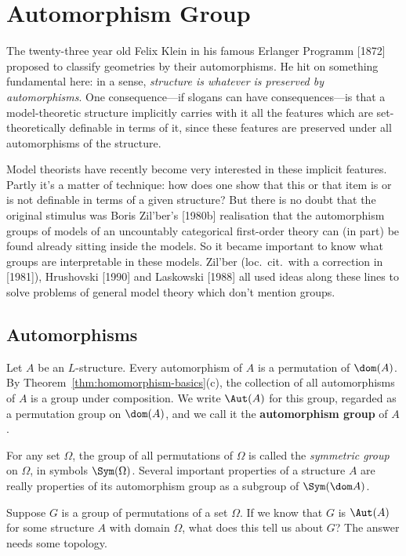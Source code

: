 \chapter{Automorphism Group}


The twenty-three year old Felix Klein in his famous Erlanger Programm [1872] proposed to classify geometries by their automorphisms. He hit on something fundamental here: in a sense, \textit{structure is whatever is preserved by automorphisms}. One consequence---if slogans can have consequences---is that a model-theoretic structure implicitly carries with it all the features which are set-theoretically definable in terms of it, since these features are preserved under all automorphisms of the structure.

Model theorists have recently become very interested in these implicit features. Partly it’s a matter of technique: how does one show that this or that item is or is not definable in terms of a given structure? But there is no doubt that the original stimulus was Boris Zil’ber’s [1980b] realisation that the automorphism groups of models of an uncountably categorical first-order theory can (in part) be found already sitting inside the models. So it became important to know what groups are interpretable in these models. Zil’ber (loc.\ cit.\ with a correction in [1981]), Hrushovski [1990] and Laskowski [1988] all used ideas along these lines to solve problems of general model theory which don’t mention groups.

\section{Automorphisms}

Let $A$ be an $L$-structure. Every automorphism of $A$ is a permutation of $\dom(A)$. By Theorem~\ref{thm:homomorphism-basics}(c), the collection of all automorphisms of $A$ is a group under composition. We write $\Aut(A)$ for this group, regarded as a permutation group on $\dom(A)$, and we call it the \textbf{automorphism group} of $A$.

For any set $\Omega$, the group of all permutations of $\Omega$ is called the \textit{symmetric group} on $\Omega$, in symbols $\Sym(\Omega)$. Several important properties of a structure $A$ are really properties of its automorphism group as a subgroup of $\Sym(\dom A)$.


Suppose $G$ is a group of permutations of a set $\Omega$. If we know that $G$ is $\Aut(A)$ for some structure $A$ with domain $\Omega$, what does this tell us about $G$? The answer needs some topology.

